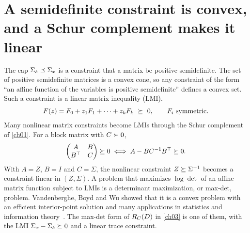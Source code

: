 

\section{A semidefinite constraint is convex, and a Schur complement makes it linear}\label{sec:ch04:lmi}

The cap $\Sigma_\delta\preceq\Sigma_x$ is a constraint that a matrix be positive semidefinite. The set of positive semidefinite matrices is a convex cone, so any constraint of the form ``an affine function of the variables is positive semidefinite'' defines a convex set. Such a constraint is a linear matrix inequality (LMI).
\begin{equation}\label{eq:ch04:lmi}
F(z)=F_0+z_1F_1+\dots+z_kF_k\ \psd\ 0,\qquad F_i\ \text{symmetric}.
\end{equation}
Many nonlinear matrix constraints become LMIs through the Schur complement of \cref{ch01}. For a block matrix with $C\succ0$,
\begin{equation}\label{eq:ch04:schur-lmi}
\begin{pmatrix}A&B\\B^{\top}&C\end{pmatrix}\succeq0\iff A-BC^{-1}B^{\top}\succeq0 .
\end{equation}
With $A=Z$, $B=I$ and $C=\Sigma$, the nonlinear constraint $Z\succeq\Sigma^{-1}$ becomes a constraint linear in $(Z,\Sigma)$. A problem that maximizes $\log\det$ of an affine matrix function subject to LMIs is a determinant maximization, or max-det, problem. Vandenberghe, Boyd and Wu showed that it is a convex problem with an efficient interior-point solution and many applications in statistics and information theory~\cite{vandenberghe1998}. The max-det form of $R_C(D)$ in \cref{ch03} is one of them, with the LMI $\Sigma_x-\Sigma_\delta\succeq0$ and a linear trace constraint.

